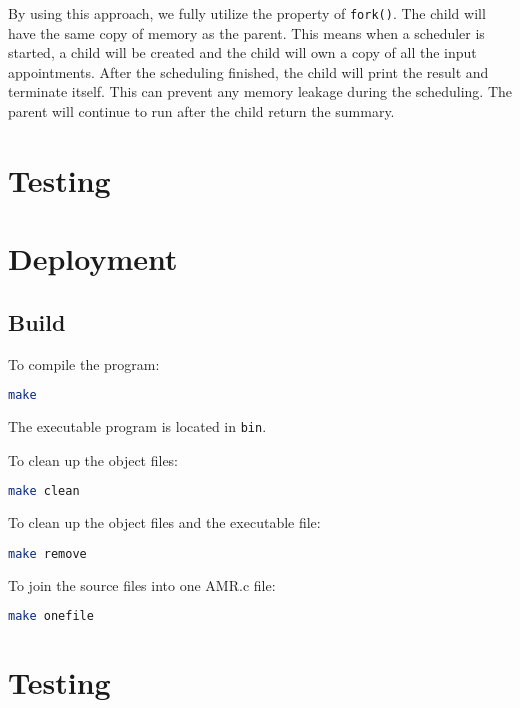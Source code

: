 \documentclass[12pt,a4paper]{report}
\begin{document}
By using this approach, we fully utilize the property of \texttt{fork()}. The child will have the same copy of memory as the parent. This means when a scheduler is started, a child will be created and the child will own a copy of all the input appointments. After the scheduling finished, the child will print the result and terminate itself. This can prevent any memory leakage during the scheduling. The parent will continue to run after the child return the summary.

\chapter{Testing}
\chapter{Deployment}
\section{Build}
To compile the program:
\begin{lstlisting}[language=bash,basicstyle=\ttfamily,keywordstyle=\bfseries]
make
\end{lstlisting}
The executable program is located in \texttt{bin}.

To clean up the object files:
\begin{lstlisting}[language=bash,basicstyle=\ttfamily,keywordstyle=\bfseries]
make clean
\end{lstlisting}

To clean up the object files and the executable file:
\begin{lstlisting}[language=bash,basicstyle=\ttfamily,keywordstyle=\bfseries]
make remove
\end{lstlisting}

To join the source files into one AMR.c file:
\begin{lstlisting}[language=bash,basicstyle=\ttfamily,keywordstyle=\bfseries]
make onefile
\end{lstlisting}
\appendix
\chapter{Testing}
\label{Appendix:Testing}
\end{document}
